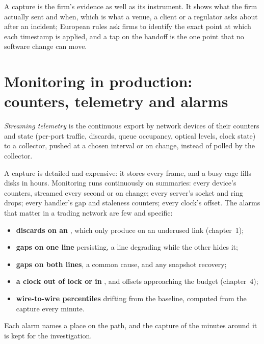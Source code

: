 A capture is the firm's evidence as well as its instrument. It shows what the firm actually sent and when, which is what a venue, a
client or a regulator asks about after an incident; European rules ask firms to identify the exact point at which each timestamp is
applied, and a tap on the handoff is the one point that no software change can move.

\section{Monitoring in production: counters, telemetry and alarms}

\begin{definition}\label{def:nw:capturing-and-monitoring-the-network:telemetry}
\emph{Streaming telemetry} is the continuous export by network devices of their counters and state
(per-port traffic, discards, queue occupancy, optical levels, clock state) to a collector, pushed at a chosen interval or on change,
instead of polled by the collector.
\end{definition}

A capture is detailed and expensive: it stores every frame, and a busy cage fills disks in hours. Monitoring runs continuously on
summaries: every device's counters, streamed every second or on change; every server's socket and ring drops; every handler's gap and
staleness counters; every clock's offset. The alarms that matter in a trading network are few and specific:
\begin{itemize}
\item \textbf{discards on an }, which only  produce on an underused link (chapter~1);
\item \textbf{gaps on one line} persisting, a line degrading while the other hides it;
\item \textbf{gaps on both lines}, a common cause, and any snapshot recovery;
\item \textbf{a clock out of lock or in }, and offsets approaching the budget (chapter~4);
\item \textbf{wire-to-wire percentiles} drifting from the baseline, computed from the capture every minute.
\end{itemize}
Each alarm names a place on the path, and the capture of the minutes around it is kept for the investigation.

